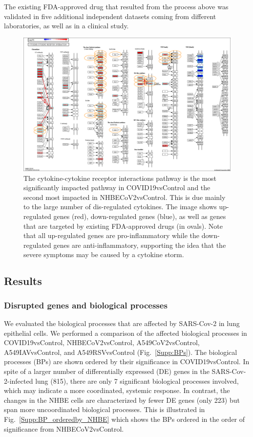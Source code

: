The existing FDA-approved drug that resulted from the process above was validated in five additional independent datasets coming from different laboratories, as well as in a clinical study.  

\begin{figure}
\centering
	\includegraphics[width=0.9\linewidth]{../Figures/Cytokine_cytokine_receptor_interaction_drugs.png}
    \caption{ The cytokine-cytokine receptor interactions pathway is the most significantly impacted pathway in COVID19vsControl and the second most impacted in NHBECoV2vsControl. This is due mainly to the large number of dis-regulated cytokines. The image shows up-regulated genes (red), down-regulated genes (blue), as well as  genes 
    that are targeted by existing FDA-approved drugs (in ovals). Note that all up-regulated genes are pro-inflammatory while the down-regulated genes are anti-inflammatory, supporting the idea that the severe symptoms may be caused by a cytokine storm.}
        \label{Supp:cytokine-cytokine_pathway}
\end{figure}




\subsection{Results}
\subsubsection{Disrupted genes and biological processes} 

We evaluated the biological processes that are affected by SARS-Cov-2 in lung epithelial cells.  We performed a  comparison of the affected biological processes in COVID19vsControl, NHBECoV2vsControl, A549CoV2vsControl, A549IAVvsControl, and A549RSVvsControl (Fig.~\ref{Supp:BPs}). 
The biological processes (BPs) are shown ordered by their significance  in  COVID19vsControl.  
In spite of a larger number of differentially expressed (DE) genes in the SARS-Cov-2-infected lung (815), there are only 7 significant biological processes involved, which may indicate a more coordinated, systemic response. In contrast, the changes in the NHBE cells are characterized by fewer DE genes (only 223) but span more uncoordinated biological processes. 
This is illustrated in Fig.~\ref{Supp:BP_orderedby_NHBE} which shows the BPs ordered in the order of significance from NHBECoV2vsControl.

